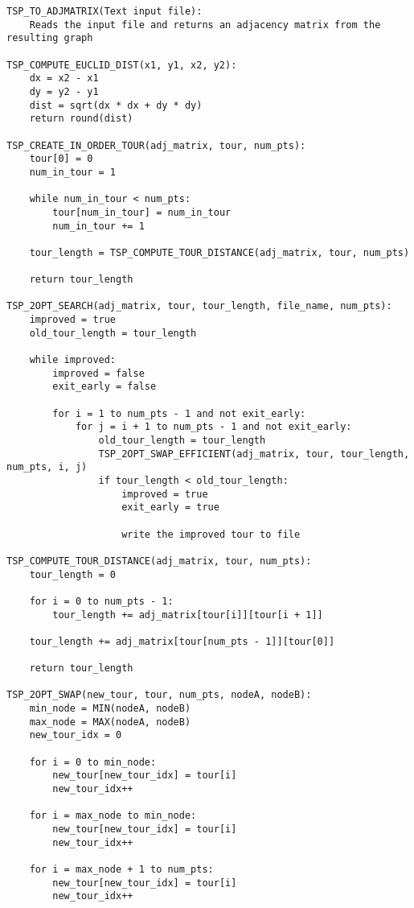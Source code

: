 \documentclass[../report/main.tex]{subfiles}
\begin{document}
\begin{verbatim}
TSP_TO_ADJMATRIX(Text input file):
    Reads the input file and returns an adjacency matrix from the resulting graph

TSP_COMPUTE_EUCLID_DIST(x1, y1, x2, y2):
    dx = x2 - x1
    dy = y2 - y1
    dist = sqrt(dx * dx + dy * dy)
    return round(dist)

TSP_CREATE_IN_ORDER_TOUR(adj_matrix, tour, num_pts):
    tour[0] = 0
    num_in_tour = 1

    while num_in_tour < num_pts:
        tour[num_in_tour] = num_in_tour
        num_in_tour += 1

    tour_length = TSP_COMPUTE_TOUR_DISTANCE(adj_matrix, tour, num_pts)

    return tour_length

TSP_2OPT_SEARCH(adj_matrix, tour, tour_length, file_name, num_pts):
    improved = true
    old_tour_length = tour_length

    while improved:
        improved = false
        exit_early = false

        for i = 1 to num_pts - 1 and not exit_early:
            for j = i + 1 to num_pts - 1 and not exit_early:
                old_tour_length = tour_length
                TSP_2OPT_SWAP_EFFICIENT(adj_matrix, tour, tour_length, num_pts, i, j)
                if tour_length < old_tour_length:
                    improved = true
                    exit_early = true

                    write the improved tour to file

TSP_COMPUTE_TOUR_DISTANCE(adj_matrix, tour, num_pts):
    tour_length = 0

    for i = 0 to num_pts - 1:
        tour_length += adj_matrix[tour[i]][tour[i + 1]]

    tour_length += adj_matrix[tour[num_pts - 1]][tour[0]]

    return tour_length

TSP_2OPT_SWAP(new_tour, tour, num_pts, nodeA, nodeB):
    min_node = MIN(nodeA, nodeB)
    max_node = MAX(nodeA, nodeB)
    new_tour_idx = 0

    for i = 0 to min_node:
        new_tour[new_tour_idx] = tour[i]
        new_tour_idx++

    for i = max_node to min_node:
        new_tour[new_tour_idx] = tour[i]
        new_tour_idx++

    for i = max_node + 1 to num_pts:
        new_tour[new_tour_idx] = tour[i]
        new_tour_idx++


\end{verbatim}
\end{document}
